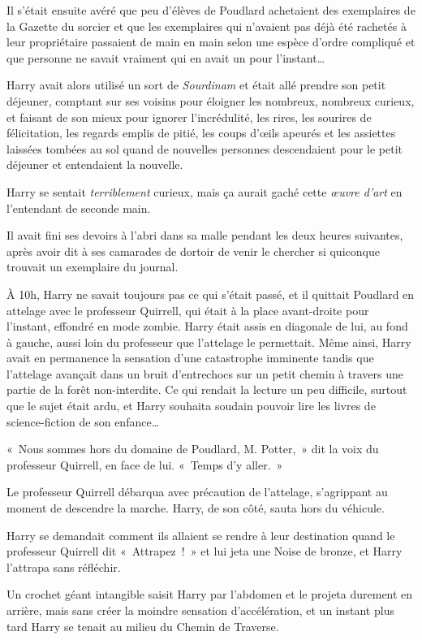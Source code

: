 Il s'était ensuite avéré que peu d'élèves de Poudlard achetaient des exemplaires de la Gazette du sorcier et que les exemplaires qui n'avaient pas déjà été rachetés à leur propriétaire passaient de main en main selon une espèce d'ordre compliqué et que personne ne savait vraiment qui en avait un pour l'instant…

Harry avait alors utilisé un sort de \emph{Sourdinam} et était allé prendre son petit déjeuner, comptant sur ses voisins pour éloigner les nombreux, nombreux curieux, et faisant de son mieux pour ignorer l'incrédulité, les rires, les sourires de félicitation, les regards emplis de pitié, les coups d'œils apeurés et les assiettes laissées tombées au sol quand de nouvelles personnes descendaient pour le petit déjeuner et entendaient la nouvelle.

Harry se sentait \emph{terriblement} curieux, mais ça aurait gaché cette \emph{œuvre d'art} en l'entendant de seconde main.

Il avait fini ses devoirs à l'abri dans sa malle pendant les deux heures suivantes, après avoir dit à ses camarades de dortoir de venir le chercher si quiconque trouvait un exemplaire du journal.

À 10h, Harry ne savait toujours pas ce qui s'était passé, et il quittait Poudlard en attelage avec le professeur Quirrell, qui était à la place avant-droite pour l'instant, effondré en mode zombie. Harry était assis en diagonale de lui, au fond à gauche, aussi loin du professeur que l'attelage le permettait. Même ainsi, Harry avait en permanence la sensation d'une catastrophe imminente tandis que l'attelage avançait dans un bruit d'entrechocs sur un petit chemin à travers une partie de la forêt non-interdite. Ce qui rendait la lecture un peu difficile, surtout que le sujet était ardu, et Harry souhaita soudain pouvoir lire les livres de science-fiction de son enfance…

«~Nous sommes hors du domaine de Poudlard, M. Potter,~» dit la voix du professeur Quirrell, en face de lui. «~Temps d'y aller.~»

Le professeur Quirrell débarqua avec précaution de l'attelage, s'agrippant au moment de descendre la marche. Harry, de son côté, sauta hors du véhicule.

Harry se demandait comment ils allaient se rendre à leur destination quand le professeur Quirrell dit «~Attrapez~!~» et lui jeta une Noise de bronze, et Harry l'attrapa sans réfléchir.

Un crochet géant intangible saisit Harry par l'abdomen et le projeta durement en arrière, mais sans créer la moindre sensation d'accélération, et un instant plus tard Harry se tenait au milieu du Chemin de Traverse.

